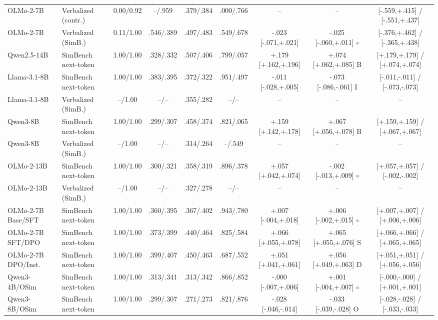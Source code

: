 \begin{table}[t]
\begin{tabular}{@{}llccccccc@{}}
OLMo-2-7B & Verbalized (contr.) & 0.00/0.92 & --/.959 & .379/.384 & .000/.766 & -- & -- & [-.559,+.415] / [-.551,+.437] \\
OLMo-2-7B & Verbalized (SimB.) & 0.11/1.00 & .546/.389 & .497/.483 & .549/.678 & -.023 [-.071,+.021] & -.025 [-.060,+.011] $\circ$ & [-.376,+.462] / [-.365,+.438] \\
Qwen2.5-14B & SimBench next-token & 1.00/1.00 & .328/.332 & .507/.406 & .799/.057 & +.179 [+.162,+.196] & +.074 [+.062,+.085] B & [+.179,+.179] / [+.074,+.074] \\
Llama-3.1-8B & SimBench next-token & 1.00/1.00 & .383/.395 & .372/.322 & .951/.497 & -.011 [-.028,+.005] & -.073 [-.086,-.061] I & [-.011,-.011] / [-.073,-.073] \\
Llama-3.1-8B & Verbalized (SimB.) & --/1.00 & --/-- & .355/.282 & --/-- & -- & -- & -- \\
Qwen3-8B & SimBench next-token & 1.00/1.00 & .299/.307 & .458/.374 & .821/.065 & +.159 [+.142,+.178] & +.067 [+.056,+.078] B & [+.159,+.159] / [+.067,+.067] \\
Qwen3-8B & Verbalized (SimB.) & --/1.00 & --/-- & .314/.264 & --/.549 & -- & -- & -- \\
OLMo-2-13B & SimBench next-token & 1.00/1.00 & .300/.321 & .358/.319 & .896/.378 & +.057 [+.042,+.074] & -.002 [-.013,+.009] $\circ$ & [+.057,+.057] / [-.002,-.002] \\
OLMo-2-13B & Verbalized (SimB.) & --/1.00 & --/-- & .327/.278 & --/-- & -- & -- & -- \\
OLMo-2-7B Base/SFT & SimBench next-token & 1.00/1.00 & .360/.395 & .367/.402 & .943/.780 & +.007 [-.004,+.018] & +.006 [-.002,+.015] $\circ$ & [+.007,+.007] / [+.006,+.006] \\
OLMo-2-7B SFT/DPO & SimBench next-token & 1.00/1.00 & .373/.399 & .440/.464 & .825/.584 & +.066 [+.055,+.078] & +.065 [+.055,+.076] S & [+.066,+.066] / [+.065,+.065] \\
OLMo-2-7B DPO/Inst. & SimBench next-token & 1.00/1.00 & .399/.407 & .450/.463 & .687/.552 & +.051 [+.041,+.061] & +.056 [+.049,+.063] D & [+.051,+.051] / [+.056,+.056] \\
Qwen3-4B/OSim & SimBench next-token & 1.00/1.00 & .313/.341 & .313/.342 & .866/.852 & -.000 [-.007,+.006] & +.001 [-.004,+.007] $\circ$ & [-.000,-.000] / [+.001,+.001] \\
Qwen3-8B/OSim & SimBench next-token & 1.00/1.00 & .299/.307 & .271/.273 & .821/.876 & -.028 [-.046,-.014] & -.033 [-.039,-.028] O & [-.028,-.028] / [-.033,-.033] \\

\end{tabular}
\end{table}
